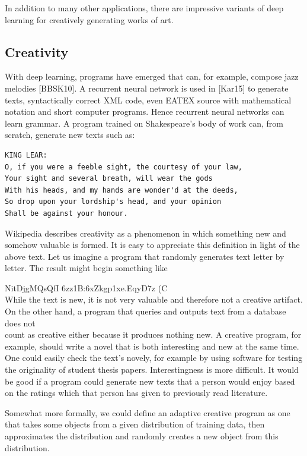 \documentclass[10pt]{article}
\begin{document}
In addition to many other applications, there are impressive variants of deep learning for creatively generating works of art.

\subsection*{Creativity}
With deep learning, programs have emerged that can, for example, compose jazz melodies [BBSK10]. A recurrent neural network is used in [Kar15] to generate texts, syntactically correct XML code, even EATEX source with mathematical notation and short computer programs. Hence recurrent neural networks can learn grammar. A program trained on Shakespeare's body of work can, from scratch, generate new texts such as:

\begin{verbatim}
KING LEAR:
O, if you were a feeble sight, the courtesy of your law,
Your sight and several breath, will wear the gods
With his heads, and my hands are wonder'd at the deeds,
So drop upon your lordship's head, and your opinion
Shall be against your honour.
\end{verbatim}

Wikipedia describes creativity as a phenomenon in which something new and somehow valuable is formed. It is easy to appreciate this definition in light of the above text. Let us imagine a program that randomly generates text letter by letter. The result might begin something like

NitDjgMQsQfI 6zz1B:6xZkgp1xe.EqyD7z (C\\
While the text is new, it is not very valuable and therefore not a creative artifact. On the other hand, a program that queries and outputs text from a database does not\\
count as creative either because it produces nothing new. A creative program, for example, should write a novel that is both interesting and new at the same time. One could easily check the text's novely, for example by using software for testing the originality of student thesis papers. Interestingness is more difficult. It would be good if a program could generate new texts that a person would enjoy based on the ratings which that person has given to previously read literature.

Somewhat more formally, we could define an adaptive creative program as one that takes some objects from a given distribution of training data, then approximates the distribution and randomly creates a new object from this distribution.
\end{document}
